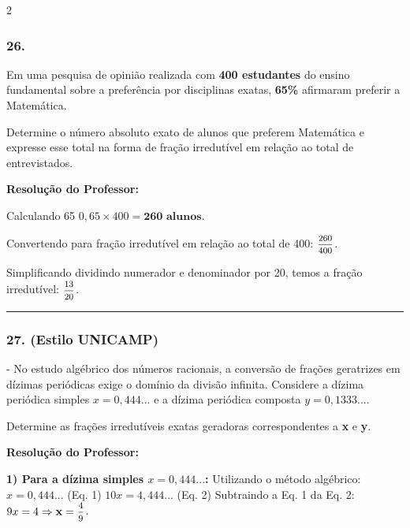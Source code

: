 \begin{multicols*}{2}
\subsubsection*{26.} Em uma pesquisa de opinião realizada com \textbf{400 estudantes} do ensino fundamental sobre a preferência por disciplinas exatas, \textbf{65\%} afirmaram preferir a Matemática. 

Determine o número absoluto exato de alunos que preferem Matemática e expresse esse total na forma de fração irredutível em relação ao total de entrevistados.

\ifgabarito
    \begin{tcolorbox}[colback=CorTitUm!5, colframe=CorTitUm, boxrule=1pt, arc=4pt, left=6pt, right=6pt, top=6pt, bottom=6pt]
    \small\textbf{\textcolor{CorTitUm}{Resolução do Professor:}}\par\vspace{0.1cm}
    \color{CinzaEscuro}
    Calculando 65%
    $0,65 \times 400 = \textbf{260 alunos}$.
    
    Convertendo para fração irredutível em relação ao total de 400:
    $\mfrac{260}{400}$. 
    
    Simplificando dividindo numerador e denominador por 20, temos a fração irredutível: $\mathbf{\mfrac{13}{20}}$.
    \end{tcolorbox}
\fi

\par\vspace{\espacoQuestao}

\noindent\textcolor{CorLinha}{\rule{\linewidth}{0.5pt}} 
\par\vspace{\espacoPreQuestao}
\subsubsection*{27. (Estilo UNICAMP)} - No estudo algébrico dos números racionais, a conversão de frações geratrizes em dízimas periódicas exige o domínio da divisão infinita. Considere a dízima periódica simples $ x = 0,444... $ e a dízima periódica composta $ y = 0,1333... $.

Determine as frações irredutíveis exatas geradoras correspondentes a \textbf{x} e \textbf{y}.

\ifgabarito
    \begin{tcolorbox}[colback=CorTitUm!5, colframe=CorTitUm, boxrule=1pt, arc=4pt, left=6pt, right=6pt, top=6pt, bottom=6pt]
    \small\textbf{\textcolor{CorTitUm}{Resolução do Professor:}}\par\vspace{0.1cm}
    \color{CinzaEscuro}
    \textbf{1) Para a dízima simples $x = 0,444...$:}
    Utilizando o método algébrico:
    $x = 0,444...$ (Eq. 1)
    $10x = 4,444...$ (Eq. 2)
    Subtraindo a Eq. 1 da Eq. 2: $9x = 4 \Rightarrow \mathbf{x = \mfrac{4}{9}}$.
    

\end{tcolorbox}
\end{multicols*}
